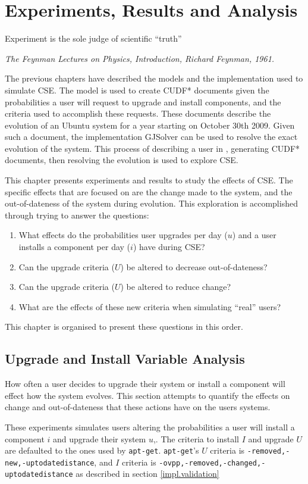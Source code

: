 
\chapter{Experiments, Results and Analysis}
\label{experiments}
\epigraph{Experiment is the sole judge of scientific ``truth''}
{\textit{The Feynman Lectures on Physics, Introduction, Richard Feynman, 1961.}}
The previous chapters have described the models and the implementation used to simulate CSE.
The \usermodel model is used to create CUDF* documents given the probabilities a user will request to upgrade and install components, 
and the criteria used to accomplish these requests.
These documents describe the evolution of an Ubuntu system for a year starting on October 30th 2009.
Given such a document, the implementation GJSolver can be used to resolve the exact evolution of the system.
This process of describing a user in \usermodel, generating CUDF* documents, then resolving the evolution is used to explore CSE.

This chapter presents experiments and results to study the effects of CSE.
The specific effects that are focused on are the change made to the system, and the out-of-dateness of the system during evolution.
This exploration is accomplished through trying to answer the questions:
\begin{enumerate}
  \item What effects do the probabilities user upgrades per day ($u$) and a user installs a component per day ($i$) have during CSE?
  \item Can the upgrade criteria ($U$) be altered to decrease out-of-dateness?
  \item Can the upgrade criteria ($U$) be altered to reduce change?
  \item What are the effects of these new criteria when simulating ``real'' users?
\end{enumerate}
This chapter is organised to present these questions in this order. 

\section{Upgrade and Install Variable Analysis}
How often a user decides to upgrade their system or install a component will effect how the system evolves.
This section attempts to quantify the effects on change and out-of-dateness that these actions have on the users systems.

These experiments simulates users altering the probabilities a user will install a component $i$ and upgrade their system $u$,.
The criteria to install $I$ and upgrade $U$ are defaulted to the ones used by \texttt{apt-get}. 
\texttt{apt-get}'s $U$ criteria is \texttt{-removed,-new,-uptodatedistance}, and $I$ criteria is \texttt{-ovpp,-removed,-changed,-uptodatedistance} as described in section \ref{impl.validation} 

